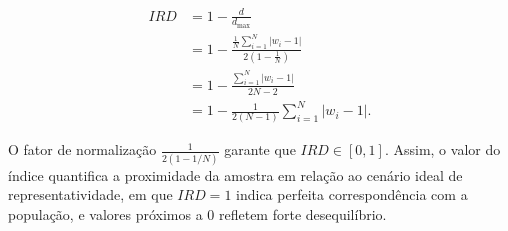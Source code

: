 \begin{equation}
    \begin{aligned}
        IRD &= 1 - \frac{d}{d_{\max}} \\
        &= 1 - \frac{\frac{1}{N} \sum_{i=1}^{N} |w_i - 1|}{2 \left(1 - \tfrac{1}{N}\right)} \\
        &= 1 - \frac{\sum_{i=1}^{N} |w_i - 1|}{2N - 2} \\
        &= 1 - \frac{1}{2(N - 1)} \sum_{i=1}^{N} |w_i - 1|.
    \end{aligned}
\end{equation}

O fator de normalização $\tfrac{1}{2(1 - 1/N)}$ garante que $IRD \in [0,1]$. 
Assim, o valor do índice quantifica a proximidade da amostra em relação ao cenário ideal de representatividade, em que $IRD = 1$ indica perfeita correspondência com a população, e valores próximos a $0$ refletem forte desequilíbrio.